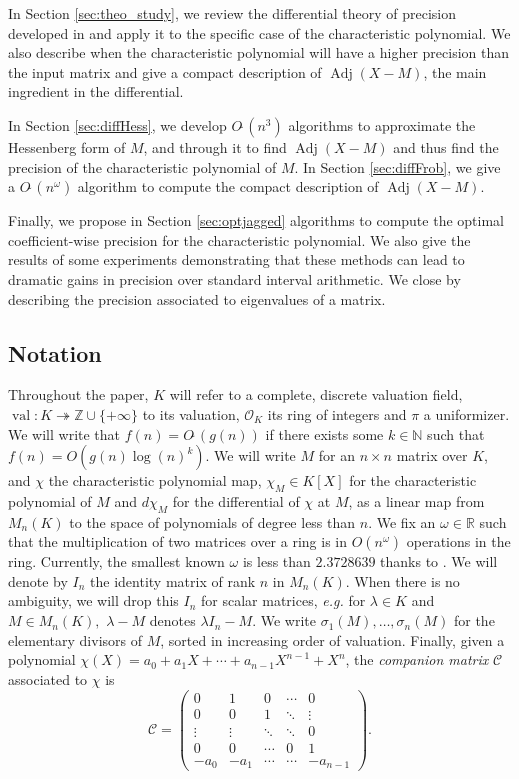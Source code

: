 \documentclass[sigconf]{acmart}
\DeclareMathOperator{\val}{val}
\DeclareMathOperator{\adj}{Adj}
\newcommand{\Z}{\mathbb Z}
\newcommand{\R}{\mathbb R}
\newcommand{\OK}{\mathcal{O}_K}
\newcommand{\softO}{O\tilde{~}}
\theoremstyle{definition}
\begin{document}
In Section \ref{sec:theo_study}, we review the differential
theory of precision developed in \cite{caruso-roe-vaccon:14a}
and apply it to the specific case of the characteristic polynomial.
We also describe when the characteristic polynomial will have a higher
precision than the input matrix and give a compact description
of $\adj(X-M)$, the main ingredient in the differential.

In Section \ref{sec:diffHess}, we develop $\softO(n^3)$ algorithms to approximate
the Hessenberg form of $M$, and through it to find $\adj(X-M)$ and thus
find the precision of the characteristic polynomial of $M$.  In Section \ref{sec:diffFrob},
we give a $\softO(n^\omega)$ algorithm to compute the compact description of $\adj(X-M)$.

Finally, we propose in Section \ref{sec:optjagged}
algorithms to compute the optimal coefficient-wise precision
for the characteristic polynomial.  We also give the results
of some experiments demonstrating that these methods can lead
to dramatic gains in precision over standard interval arithmetic.
We close by describing the precision associated to
eigenvalues of a matrix.

\subsection*{Notation} Throughout the paper, $K$ will refer to a complete,
discrete valuation field, $\val : K \twoheadrightarrow \Z \cup \{+\infty\}$ to its valuation,
$\OK$ its ring of integers and $\pi$ a uniformizer. 
We will write that $f(n)=\softO (g(n))$ if there exists some
$k \in \mathbb{N}$ such that $f(n)=O(g(n) \log (n)^k).$
We will write $M$ for an $n \times n$ matrix over $K$,
and $\chi$ the characteristic polynomial map, $\chi_M \in K[X]$ for
the characteristic polynomial of $M$ and $d\chi_M$ for the differential
of $\chi$ at $M$, as a linear map from $M_n(K)$ to the space
of polynomials of degree less than $n$.
We fix an $\omega \in \R$ such that the multiplication
of two matrices over a ring is in $O(n^\omega)$ operations in the
ring. Currently, the smallest known $\omega$ is less than
$2.3728639 $ thanks to \cite{legall:14a}. 
We will denote by $I_n$ the identity matrix of rank $n$ in $M_n(K).$
When there is no ambiguity, we will drop this $I_n$
for scalar matrices, \textit{e.g.} for $\lambda \in K$
and $M \in M_n (K),$ $\lambda-M$ denotes $\lambda I_n - M.$
We write $\sigma_1(M), \dots, \sigma_n(M)$ for the
elementary divisors of $M$, sorted in increasing order of valuation.
Finally, given a polynomial $\chi(X) = a_0 + a_1 X + \cdots + a_{n-1} X^{n-1} + X^n$,
the \emph{companion matrix} $\mathscr{C}$ associated to $\chi$ is
\begin{equation}
\label{eq:companion}
\mathscr{C} = \left( \begin{matrix}
0 & 1 & 0 & \cdots & 0 \\
0 & 0 & 1 & \ddots & \vdots \\
\vdots & \vdots & \ddots & \ddots & 0 \\
0 & 0 & \cdots & 0 & 1 \\
-a_0 & -a_1 & \cdots & \cdots & -a_{n-1}
\end{matrix} \right).
\end{equation}
\end{document}
